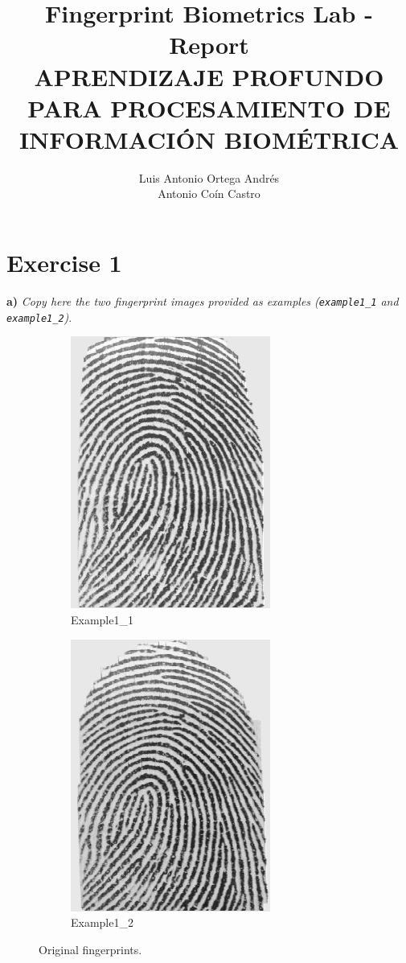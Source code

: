 \documentclass[11pt]{article}
\author{Luis Antonio Ortega Andrés\\Antonio Coín Castro}
\date{}
\title{Fingerprint Biometrics Lab - Report\\\medskip
\large APRENDIZAJE PROFUNDO PARA PROCESAMIENTO DE INFORMACIÓN BIOMÉTRICA}
\begin{document}
\maketitle

\section*{Exercise 1}
\textbf{a) } \emph{Copy here the two fingerprint images provided as examples (\texttt{example1\_1} and \texttt{example1\_2})}.

\begin{figure}[h!]
  \centering
       \begin{subfigure}[t]{0.45\textwidth}
         \centering
         \includegraphics[scale=0.8]{img/example1_1.png}
         \caption{Example1\_1}
     \end{subfigure}%
     \quad
     \begin{subfigure}[t]{0.45\textwidth}
         \centering
         \includegraphics[scale=0.8]{img/example1_2.png}
         \caption{Example1\_2}
     \end{subfigure}
    \caption{Original fingerprints.}
    \label{fig:ex1a}
\end{figure}
\end{document}
